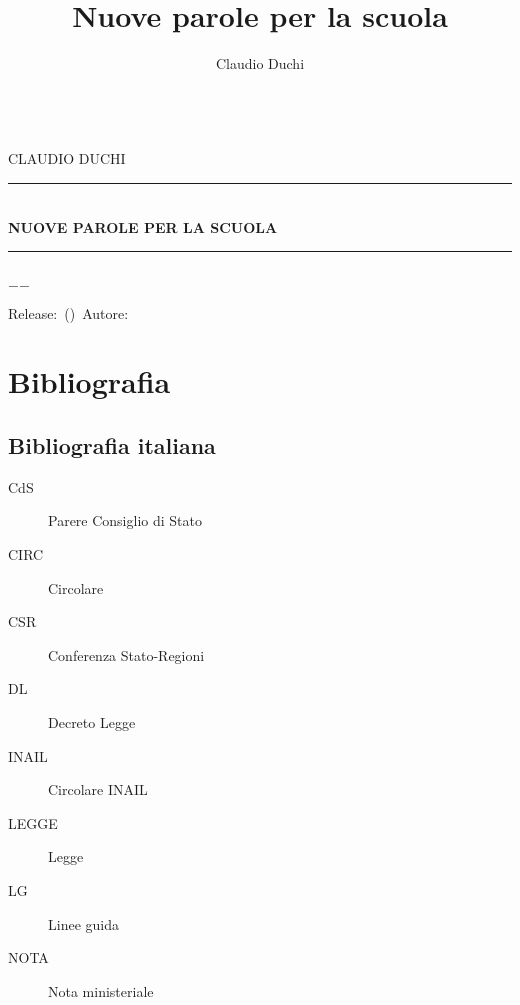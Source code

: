 \documentclass[a4paper]{book}%
\title{Nuove parole per la scuola}
\author{Claudio Duchi}
\date{\datetime}
\makeatletter
\newcommand{\HRule}{\rule{\linewidth}{0.5mm}}
\renewcommand\frontmatter{%
	\cleardoublepage
	\@mainmatterfalse
	\pagenumbering{arabic}}
\renewcommand\mainmatter{%
	\cleardoublepage
	\@mainmattertrue}
\makeatother
\begin{document}
\let\cleardoublepage\clearpage
	\pagestyle{fancy}
	\fncyfront
	\frontmatter
		\hypersetup{pageanchor=false}
		\begin{titlepage}\parindent=0pt
			\centering
	\begin{center}
	\Lgrandedue\\[1cm]
	\textsc{\trjnfamily\LARGE CLAUDIO DUCHI}\\[1.2cm]
	\HRule \\[0.4cm]
	{ \trjnfamily\huge \bfseries NUOVE PAROLE PER LA SCUOLA}\\[0.4cm]
	\HRule \\[1.2cm]
	\vfill
	{\large $-$\DTMnow$-$}	
\end{center}
{\centering
	Release:\gitReln\ (\gitAbbrevHash)\ Autore:\gitAuthorName\ 
	\gitCommitterDate \\
}
		\end{titlepage}
	\setcounter{page}{2}
		\CDcopyright
		\tableofcontents
			\listoftables
{}  %
			
	\fncymain
	\mainmatter
\cleardoublepage
\glsaddall	
\printglossaries
	
\nocite{*}



\chapter{Bibliografia}

 \section{Bibliografia italiana}
 \begin{description}
 	\item[CdS] Parere Consiglio di Stato
 	\item[CIRC] Circolare 
 	\item[CSR] Conferenza Stato-Regioni
 	\item[DL] Decreto Legge
 	\item[INAIL] Circolare INAIL
 	\item[LEGGE] Legge
 	\item[LG] Linee guida
 	\item[NOTA] Nota ministeriale
 \end{description}
\printbibliography[keyword=LEX,heading=subbibliography]
\end{document}
